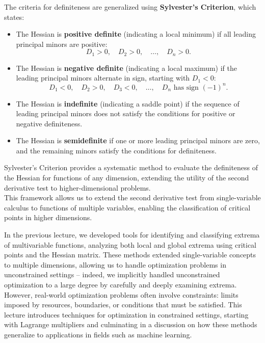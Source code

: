 \noindent The criteria for definiteness are generalized using \textbf{Sylvester's Criterion},  which states:
\begin{itemize}
    \item The Hessian is \textbf{positive definite} (indicating a local minimum) if all leading principal minors are positive:
    \[
    D_1 > 0, \quad D_2 > 0, \quad \dots, \quad D_n > 0.
    \]
    \item The Hessian is \textbf{negative definite} (indicating a local maximum) if the leading principal minors alternate in sign, starting with \( D_1 < 0 \):
    \[
    D_1 < 0, \quad D_2 > 0, \quad D_3 < 0, \quad \dots, \quad D_n \text{ has sign } (-1)^n.
    \]
    \item The Hessian is \textbf{indefinite} (indicating a saddle point) if the sequence of leading principal minors does not satisfy the conditions for positive or negative definiteness.
    \item The Hessian is \textbf{semidefinite} if one or more leading principal minors are zero, and the remaining minors satisfy the conditions for definiteness.
\end{itemize}

\noindent Sylvester's Criterion provides a systematic method to evaluate the definiteness of the Hessian for functions of any dimension, extending the utility of the second derivative test to higher-dimensional problems. \\

\noindent This framework allows us to extend the second derivative test from single-variable calculus to functions of multiple variables, enabling the classification of critical points in higher dimensions.


\newpage


\noindent In the previous lecture, we developed tools for identifying and classifying extrema of multivariable functions, analyzing both local and global extrema using critical points and the Hessian matrix. These methods extended single-variable concepts to multiple dimensions, allowing us to handle optimization problems in unconstrained settings -- indeed, we implicitly handled unconstrained optimization to a large degree by carefully and deeply examining extrema. However, real-world optimization problems often involve constraints: limits imposed by resources, boundaries, or conditions that must be satisfied. This lecture introduces techniques for optimization in constrained settings, starting with Lagrange multipliers and culminating in a discussion on how these methods generalize to applications in fields such as machine learning.

